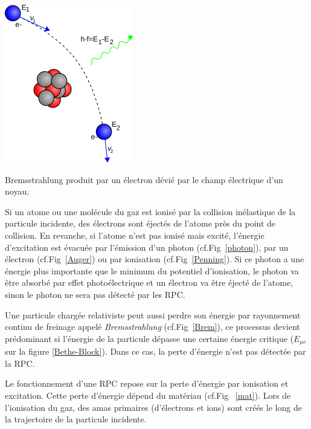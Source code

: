 \marginpar
{
	\centering
	\includegraphics[width=\marginparwidth]{RPC/Brem.png}
	\captionsetup{type=figure}\caption{Bremsstrahlung produit par un électron dévié par le champ électrique d'un noyau.}
	\label{Brem}
}

Si un atome ou une molécule du gaz est ionisé par la collision inélastique de la particule incidente, des électrons sont éjectés de l'atome près du point de collision. En revanche, si l'atome n'est pas ionisé mais excité, l'énergie d'excitation est évacuée par l'émission d'un photon (cf.Fig~\ref{photon}), par un électron  (cf.Fig~\ref{Auger}) ou par ionisation  (cf.Fig~\ref{Penning}). Si ce photon a une énergie plus importante que le minimum du potentiel d'ionisation, le photon va être absorbé par effet photoélectrique et un électron va être éjecté de l'atome, sinon le photon ne sera pas détecté par les RPC.

Une particule chargée relativiste peut aussi perdre son énergie par rayonnement continu de freinage appelé \textit{Bremsstrahlung} (cf.Fig~\ref{Brem}), ce processus devient prédominant si l'énergie de la particule dépasse une certaine énergie critique ($E_{\mu c}$ sur la figure \ref{Bethe-Block}). Dans ce cas, la perte d'énergie n'est pas détectée par la RPC.

Le fonctionnement d'une RPC repose sur la perte d'énergie par ionisation et excitation. Cette perte d'énergie dépend du matériau (cf.Fig~ \ref{mat}). Lors de l'ionisation du gaz, des amas primaires (d'électrons et ions) sont créés le long de la trajectoire de la particule incidente. 


